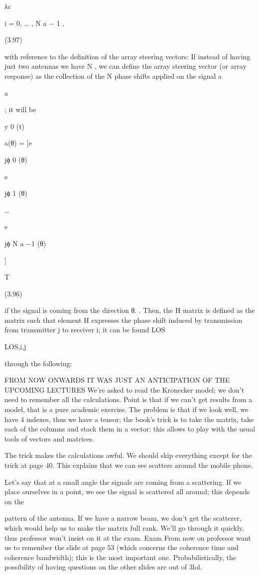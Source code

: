 {{{{λc

i = 0, … , N a − 1 ,

(3.97)

with reference to the definition of the array steering vectors:
If instead of having just two antennas we have N , we can define the array steering vector (or array response) as the collection of the N phase shifts applied on the signal a

a

; it will be

y 0 (t)

a(θ) = [e

jϕ 0 (θ)

e

jϕ 1 (θ)

…

e

jϕ N a −1 (θ)

]

T

(3.96)

if the signal is coming from the direction θ.
.
Then, the H matrix is defined as the matrix such that element H expresses the phase shift induced by transmission from transmitter j to receiver i; it can be found LOS

LOS,i,j

through the following:

FROM NOW ONWARDS IT WAS JUST AN ANTICIPATION OF THE UPCOMING LECTURES We're asked to read the Kronecker model; we don't need to remember all the calculations.
Point is that if we can't get results from a model, that is a pure academic exercise.
The problem is that if we look well, we have 4 indexes, thus we have a tensor; the book's trick is to take the matrix, take each of the columns and stack them in a vector:
this allows to play with the usual tools of vectors and matrices.

The trick makes the calculations awful.
We should skip everything except for the trick at page 40. This explains that we can see scatters around the mobile phone.

Let's say that at a small angle the signals are coming from a scattering. If we place ourselves in a point, we see the signal is scattered all around; this depends on the

pattern of the antenna.
If we have a narrow beam, we don't get the scatterer, which would help us to make the matrix full rank.
We'll go through it quickly, thus professor won't insist on it at the exam.
Exam From now on professor want us to remember the slide at page 53 (which concerns the coherence time and coherence bandwidth); this is the most important one.
Probabilistically, the possibility of having questions on the other slides are out of 3\sigma lol.

}}}}
